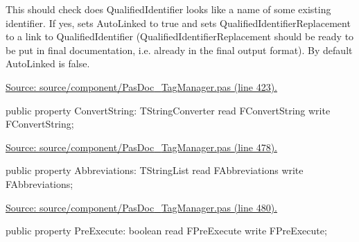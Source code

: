 \documentclass{report}
\newif\ifpdf
\begin{document}
\begin{list}{}
\begin{flushleft}
\ifpdf
\end{flushleft}
\fi


\par This should check does QualifiedIdentifier looks like a name of some existing identifier. If yes, sets AutoLinked to true and sets QualifiedIdentifierReplacement to a link to QualifiedIdentifier (QualifiedIdentifierReplacement should be ready to be put in final documentation, i.e. already in the final output format). By default AutoLinked is false.\par
\href{https://github.com/pasdoc/pasdoc/blob/master/source/component/PasDoc_TagManager.pas#L423}{Source: source/component/PasDoc{\_}TagManager.pas (line 423).}\label{PasDoc_TagManager.TTagManager-ConvertString}
\item[\textbf{ConvertString}\hfill]
\ifpdf
\begin{flushleft}
\fi
\begin{ttfamily}
public property ConvertString: TStringConverter
      read FConvertString write FConvertString;\end{ttfamily}

\ifpdf
\end{flushleft}
\fi


\par  \par
\href{https://github.com/pasdoc/pasdoc/blob/master/source/component/PasDoc_TagManager.pas#L478}{Source: source/component/PasDoc{\_}TagManager.pas (line 478).}\label{PasDoc_TagManager.TTagManager-Abbreviations}
\item[\textbf{Abbreviations}\hfill]
\ifpdf
\begin{flushleft}
\fi
\begin{ttfamily}
public property Abbreviations: TStringList read FAbbreviations write FAbbreviations;\end{ttfamily}

\ifpdf
\end{flushleft}
\fi


\par  \par
\href{https://github.com/pasdoc/pasdoc/blob/master/source/component/PasDoc_TagManager.pas#L480}{Source: source/component/PasDoc{\_}TagManager.pas (line 480).}\label{PasDoc_TagManager.TTagManager-PreExecute}
\item[\textbf{PreExecute}\hfill]
\ifpdf
\begin{flushleft}
\fi
\begin{ttfamily}
public property PreExecute: boolean
      read FPreExecute write FPreExecute;\end{ttfamily}


\end{flushleft}
\end{list}
\end{document}
